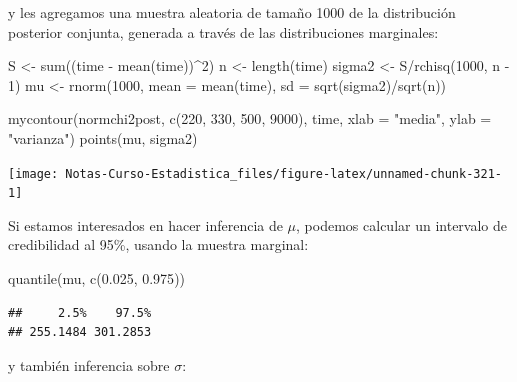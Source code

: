 \documentclass[
  12pt,
]{book}
\newenvironment{Shaded}{\begin{snugshade}}{\end{snugshade}}
\newcommand{\AttributeTok}[1]{\textcolor[rgb]{0.77,0.63,0.00}{#1}}
\newcommand{\DecValTok}[1]{\textcolor[rgb]{0.00,0.00,0.81}{#1}}
\newcommand{\FloatTok}[1]{\textcolor[rgb]{0.00,0.00,0.81}{#1}}
\newcommand{\FunctionTok}[1]{\textcolor[rgb]{0.00,0.00,0.00}{#1}}
\newcommand{\NormalTok}[1]{#1}
\newcommand{\OtherTok}[1]{\textcolor[rgb]{0.56,0.35,0.01}{#1}}
\newcommand{\SpecialCharTok}[1]{\textcolor[rgb]{0.00,0.00,0.00}{#1}}
\newcommand{\StringTok}[1]{\textcolor[rgb]{0.31,0.60,0.02}{#1}}
\theoremstyle{definition}
\theoremstyle{definition}
\theoremstyle{definition}
\theoremstyle{definition}
\theoremstyle{remark}
\begin{document}
y les agregamos una muestra aleatoria de tamaño 1000 de la distribución posterior conjunta, generada a través de las distribuciones marginales:

\begin{Shaded}
\begin{Highlighting}[]
\NormalTok{S }\OtherTok{\textless{}{-}} \FunctionTok{sum}\NormalTok{((time }\SpecialCharTok{{-}} \FunctionTok{mean}\NormalTok{(time))}\SpecialCharTok{\^{}}\DecValTok{2}\NormalTok{)}
\NormalTok{n }\OtherTok{\textless{}{-}} \FunctionTok{length}\NormalTok{(time)}
\NormalTok{sigma2 }\OtherTok{\textless{}{-}}\NormalTok{ S}\SpecialCharTok{/}\FunctionTok{rchisq}\NormalTok{(}\DecValTok{1000}\NormalTok{, n }\SpecialCharTok{{-}} \DecValTok{1}\NormalTok{)}
\NormalTok{mu }\OtherTok{\textless{}{-}} \FunctionTok{rnorm}\NormalTok{(}\DecValTok{1000}\NormalTok{, }\AttributeTok{mean =} \FunctionTok{mean}\NormalTok{(time), }\AttributeTok{sd =} \FunctionTok{sqrt}\NormalTok{(sigma2)}\SpecialCharTok{/}\FunctionTok{sqrt}\NormalTok{(n))}

\FunctionTok{mycontour}\NormalTok{(normchi2post, }\FunctionTok{c}\NormalTok{(}\DecValTok{220}\NormalTok{, }\DecValTok{330}\NormalTok{, }\DecValTok{500}\NormalTok{, }\DecValTok{9000}\NormalTok{), time,}
    \AttributeTok{xlab =} \StringTok{"media"}\NormalTok{, }\AttributeTok{ylab =} \StringTok{"varianza"}\NormalTok{)}
\FunctionTok{points}\NormalTok{(mu, sigma2)}
\end{Highlighting}
\end{Shaded}

\begin{center}\texttt{[image: Notas-Curso-Estadistica\_files/figure-latex/unnamed-chunk-321-1]} \end{center}

Si estamos interesados en hacer inferencia de \(\mu\), podemos calcular un intervalo de credibilidad al 95\%, usando la muestra marginal:

\begin{Shaded}
\begin{Highlighting}[]
\FunctionTok{quantile}\NormalTok{(mu, }\FunctionTok{c}\NormalTok{(}\FloatTok{0.025}\NormalTok{, }\FloatTok{0.975}\NormalTok{))}
\end{Highlighting}
\end{Shaded}

\begin{verbatim}
##     2.5%    97.5% 
## 255.1484 301.2853
\end{verbatim}

y también inferencia sobre \(\sigma\):
\end{document}
